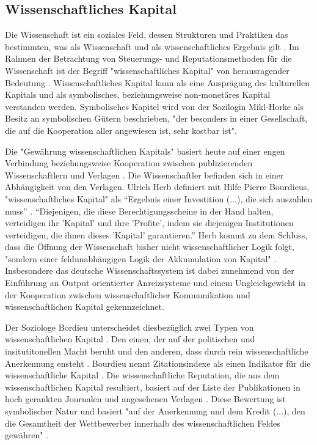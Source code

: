 \subsection{Wissenschaftliches Kapital}
Die Wissenschaft ist ein soziales Feld, dessen Strukturen und Praktiken das bestimmten, was als Wissenschaft und als wissenschaftliches Ergebnis gilt \cite{mikl_2010_soziologie}. Im Rahmen der Betrachtung von Steuerungs- und Reputationsmethoden für die Wissenschaft ist der Begriff "wissenschaftliches Kapital" von herausragender Bedeutung \cite{suchen}. Wissenschaftliches Kapital kann als eine Ausprägung des kulturellen Kapitals und als symbolisches, beziehungsweise non-monetäres Kapital \cite{irmer2011} verstanden werden. Symbolisches Kapitel wird von der Sozilogin Mikl-Horke als Besitz an symbolischen Gütern beschrieben, "der besonders in einer Gesellschaft, die auf die Kooperation aller angewiesen ist, sehr kostbar ist"\cite{mikl_2010_soziologie}.

Die "Gewährung wissenschaftlichen Kapitals" basiert heute auf einer engen Verbindung beziehungsweise Kooperation zwischen publizierenden Wissenschaftlern und Verlagen \cite{herb_2006}. Die Wissenschaftler befinden sich in einer Abhängigkeit von den Verlagen. Ulrich Herb definiert mit Hilfe Pierre Bourdieus, "wissenschaftliches Kapital" als “Ergebnis einer Investition (...), die sich auszahlen muss” \cite{herb_2006}. “Diejenigen, die diese Berechtigungsscheine in der Hand halten, verteidigen ihr 'Kapital' und ihre 'Profite', indem sie diejenigen Institutionen verteidigen, die ihnen dieses 'Kapital' garantieren.” \cite{Bourdieu_1992} Herb kommt zu dem Schluss, dass die Öffnung der Wissenschaft bisher nicht wissenschaftlicher Logik folgt, "sondern einer feldunabhängigen Logik der Akkumulation von Kapital" \cite{herb_2006}. Insbesondere das deutsche Wissenschaftssystem ist dabei zunehmend von der Einführung an Output orientierter Anreizsysteme \cite{osterloh2008anreize} und einem Ungleichgewicht in der Kooperation zwischen wissenschaftlicher Kommunikation und wissenschaftlichen Kapital gekennzeichnet.

Der Soziologe Bordieu unterscheidet diesbezüglich zwei Typen von wissenschaftlichen Kapital \cite{Bourdieu_1998}. Den einen, der auf der politischen und insitutitonellen Macht beruht und den anderen, dass durch rein wissenschaftliche Anerkennung ensteht \cite{mikl_2010_soziologie}. Bourdieu nennt Zitationsindexe als einen Indikator für die wissenschaftliche Kapital \cite{Bourdieu_1998}. Die wissenschaftliche Reputation, die aus dem wissenschaftlichen Kapital resultiert, basiert auf der Liste der Publikationen in hoch gerankten Journalen und angesehenen Verlagen \cite{herb_2010}. Diese Bewertung ist symbolischer Natur und basiert "auf der Anerkennung und dem Kredit (...), den die Gesamtheit der Wettbewerber innerhalb des wissenschaftlichen Feldes gewähren" \cite{Bourdieu_1998} \cite{herb_2010}.

